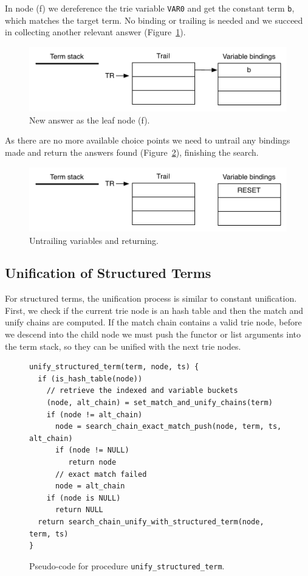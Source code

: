 In node (f) we dereference the trie variable \texttt{VAR0} and get the constant term \texttt{b}, which matches the target term. No binding or trailing is needed and we succeed in collecting another relevant answer (Figure~\ref{fig:collect_ex5}).

\begin{figure}[H]
  \centering
    \includegraphics[scale=0.5]{collect_ex5.pdf}
  \caption{New answer as the leaf node (f).}
  \label{fig:collect_ex5}
\end{figure}

As there are no more available choice points we need to untrail any bindings made and return
the answers found (Figure~\ref{fig:collect_ex6}), finishing the search.

\begin{figure}[H]
  \centering
    \includegraphics[scale=0.5]{collect_ex6.pdf}
  \caption{Untrailing variables and returning.}
  \label{fig:collect_ex6}
\end{figure}

\subsection{Unification of Structured Terms}

For structured terms, the unification process is similar to constant unification.
First, we check if the current trie node is an hash table and then the match and unify
chains are computed. If the match chain contains a valid trie node, before we descend
into the child node we must push the functor or list arguments into the term stack,
so they can be unified with the next trie nodes.

\begin{figure}[ht]
\begin{Verbatim}
unify_structured_term(term, node, ts) {
  if (is_hash_table(node))
    // retrieve the indexed and variable buckets
    (node, alt_chain) = set_match_and_unify_chains(term)
    if (node != alt_chain)
      node = search_chain_exact_match_push(node, term, ts, alt_chain)
      if (node != NULL)
         return node
      // exact match failed
      node = alt_chain
    if (node is NULL)
      return NULL
  return search_chain_unify_with_structured_term(node, term, ts)
}
\end{Verbatim}
\caption{Pseudo-code for procedure \texttt{unify\_structured\_term}.}
\label{fig:unify_structured_term}
\end{figure}


